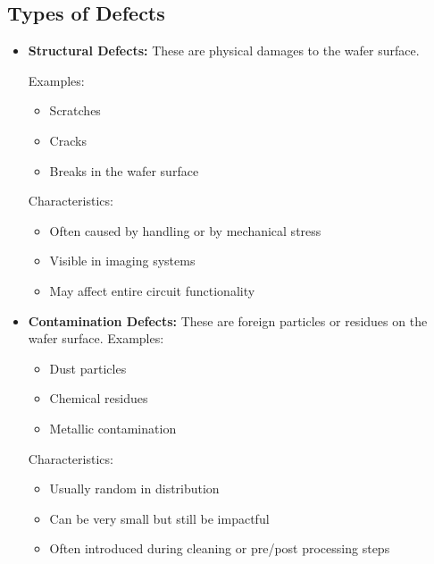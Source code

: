 \subsection{Types of Defects}
\begin{itemize}
     \item \textbf{Structural Defects:}
    These are physical damages to the wafer surface.

    Examples:
    \begin{itemize}
        \item Scratches
        \item Cracks
        \item Breaks in the wafer surface
    \end{itemize}
    Characteristics:
        \begin{itemize}
            \item Often caused by handling or by mechanical stress
            \item Visible in imaging systems
            \item May affect entire circuit functionality
        \end{itemize}
      \item \textbf{Contamination Defects:}
        These are foreign particles or residues on the wafer surface.
        Examples:
    \begin{itemize}
        \item Dust particles
        \item Chemical residues
        \item Metallic contamination
    \end{itemize}
    Characteristics:
        \begin{itemize}
            \item Usually random in distribution
            \item Can be very small but still be impactful
            \item Often introduced during cleaning or pre/post processing steps
        \end{itemize}


\end{itemize}
